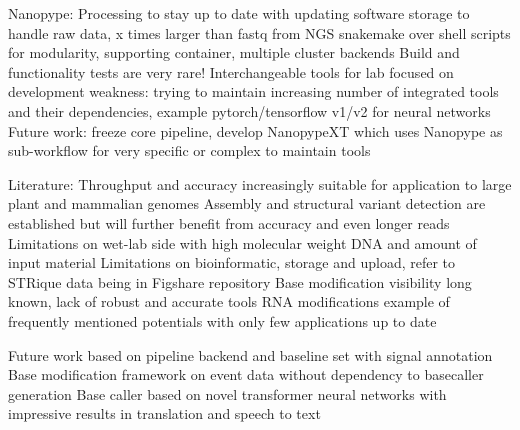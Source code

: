Nanopype: Processing to stay up to date with updating software
storage to handle raw data, x times larger than fastq from NGS
snakemake over shell scripts for modularity, supporting container, multiple cluster backends
Build and functionality tests are very rare!
Interchangeable tools for lab focused on development
weakness: trying to maintain increasing number of integrated tools and their dependencies, example pytorch/tensorflow v1/v2 for neural networks
Future work: freeze core pipeline, develop NanopypeXT which uses Nanopype as sub-workflow for very specific or complex to maintain tools

Literature: Throughput and accuracy increasingly suitable for application to large plant and mammalian genomes
Assembly and structural variant detection are established but will further benefit from accuracy and even longer reads
Limitations on wet-lab side with high molecular weight DNA and amount of input material
Limitations on bioinformatic, storage and upload, refer to STRique data being in Figshare repository
Base modification visibility long known, lack of robust and accurate tools
RNA modifications example of frequently mentioned potentials with only few applications up to date

Future work based on pipeline backend and baseline set with signal annotation
Base modification framework on event data without dependency to basecaller generation
Base caller based on novel transformer neural networks with impressive results in translation and speech to text







